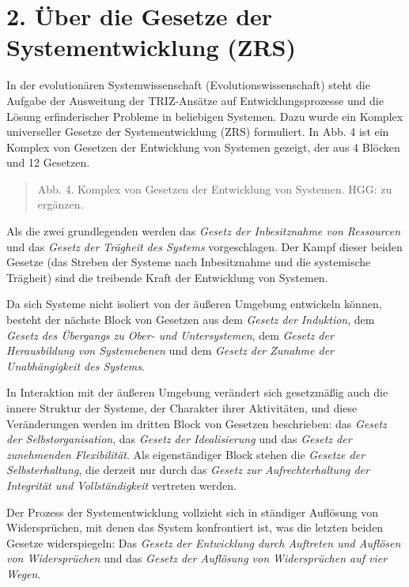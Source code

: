 \documentclass[11pt,a4paper]{article}
\begin{document}
\section*{2. Über die Gesetze der Systementwicklung (ZRS)}
In der evolutionären Systemwissenschaft (Evolutionswissenschaft) steht die
Aufgabe der Ausweitung der TRIZ-Ansätze auf Entwicklungsprozesse und die
Lösung erfinderischer Probleme in beliebigen Systemen. Dazu wurde ein Komplex
universeller Gesetze der Systementwicklung (ZRS) formuliert. In Abb. 4 ist ein
Komplex von Gesetzen der Entwicklung von Systemen gezeigt, der aus 4 Blöcken
und 12 Gesetzen.
\begin{quote}
  Abb. 4. Komplex von Gesetzen der Entwicklung von Systemen. HGG: zu ergänzen.
\end{quote}
Als die zwei grundlegenden werden das \emph{Gesetz der Inbesitznahme von
  Ressourcen} und das \emph{Gesetz der Trägheit des Systems} vorgeschlagen.
Der Kampf dieser beiden Gesetze (das Streben der Systeme nach Inbesitznahme
und die systemische Trägheit) sind die treibende Kraft der Entwicklung von
Systemen.

Da sich Systeme nicht isoliert von der äußeren Umgebung entwickeln können,
besteht der nächste Block von Gesetzen aus dem \emph{Gesetz der Induktion},
dem \emph{Gesetz des Übergangs zu Ober- und Untersystemen}, dem \emph{Gesetz
  der Herausbildung von Systemebenen} und dem \emph{Gesetz der Zunahme der
  Unabhängigkeit des Systems}.

In Interaktion mit der äußeren Umgebung verändert sich gesetzmäßig auch die
innere Struktur der Systeme, der Charakter ihrer Aktivitäten, und diese
Veränderungen werden im dritten Block von Gesetzen beschrieben: das
\emph{Gesetz der Selbstorganisation}, das \emph{Gesetz der Idealisierung} und
das \emph{Gesetz der zunehmenden Flexibilität}.  Als eigenständiger Block
stehen die \emph{Gesetze der Selbsterhaltung}, die derzeit nur durch das
\emph{Gesetz zur Aufrechterhaltung der Integrität und Vollständigkeit}
vertreten werden.

Der Prozess der Systementwicklung vollzieht sich in ständiger Auflösung von
Widersprüchen, mit denen das System konfrontiert ist, was die letzten beiden
Gesetze widerspiegeln: Das \emph{Gesetz der Entwicklung durch Auftreten und
  Auflösen von Widersprüchen} und das \emph{Gesetz der Auflösung von
  Widersprüchen auf vier Wegen}.
\end{document}
